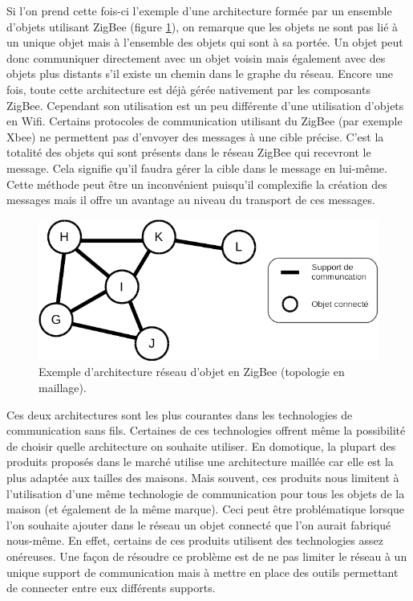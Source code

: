       Si l'on prend cette fois-ci l'exemple d'une architecture formée par un ensemble d'objets utilisant 
      ZigBee (figure \ref{netGraph}), on remarque que les objets ne sont pas lié à un unique objet
      mais à l'ensemble des objets qui sont à sa portée. Un objet peut donc communiquer directement
      avec un objet voisin mais également avec des objets plus distants s'il existe un chemin dans
      le graphe du réseau. Encore une fois, toute cette architecture est déjà gérée nativement par
      les composants ZigBee. Cependant son utilisation est un peu différente d'une utilisation 
		d'objets en Wifi. Certains protocoles de communication utilisant du ZigBee (par exemple Xbee) 
		ne permettent pas d'envoyer des messages à une cible précise. C'est la totalité des objets qui sont présents dans le réseau ZigBee qui recevront le message. Cela signifie qu'il faudra gérer
		la cible dans le message en lui-même. Cette méthode peut être un inconvénient puisqu'il complexifie la création des messages mais il offre un avantage au niveau du transport de ces
		messages.
      
      \begin{figure}[!ht]
         \centering
         \includegraphics[width=.8\textwidth]{img/reseau_graphe.png}
         \caption{Exemple d'architecture réseau d'objet en ZigBee (topologie en maillage).}
         \label{netGraph}
      \end{figure}
      
      Ces deux architectures sont les plus courantes dans les technologies de communication sans fils. Certaines de ces technologies offrent même la possibilité de choisir quelle architecture on souhaite utiliser. En domotique, la plupart des produits proposés dans le		marché utilise une architecture maillée car elle est la plus adaptée aux tailles des maisons. Mais souvent, ces produits nous limitent à l'utilisation d'une même technologie de communication pour tous les objets de la maison (et également de la même marque). Ceci peut être problématique lorsque l'on souhaite ajouter dans le réseau un objet connecté que l'on aurait fabriqué nous-même. En effet, certains de ces produits utilisent des technologies assez onéreuses. Une façon de résoudre ce problème est de ne pas limiter le réseau à un unique support de communication mais à mettre en place des outils permettant de connecter entre eux différents supports.
		
